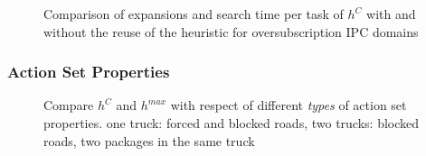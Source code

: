 \begin{figure}[ht]
	\scriptsize
	\begin{minipage}{0.5\textwidth}
		
	\end{minipage}
	\begin{minipage}{0.2\textwidth}
		
	\end{minipage}
	\hfill
	\begin{minipage}{0.2\textwidth}
		
	\end{minipage}
	\begin{minipage}{0.2\textwidth}
		
	\end{minipage}
	\hfill
	\begin{minipage}{0.2\textwidth}
		
	\end{minipage}

	\caption{Comparison of expansions and search time per task of $h^{C}$ with and 
	without the reuse of the heuristic for oversubscription IPC domains}
\end{figure}


\FloatBarrier
\newpage
\subsubsection*{Action Set Properties}

\begin{figure}[ht]
	
	
	\caption{Compare $h^C$ and $h^{max}$ with respect of different \emph{types} of action set properties. 
	one truck: forced and blocked roads, two trucks: blocked roads, two packages in the same truck}
\end{figure}

